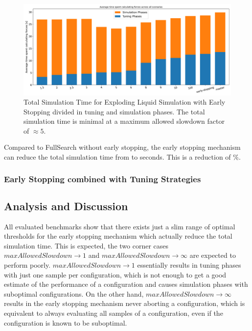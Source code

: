 \documentclass[conference]{IEEEtran}
\begin{document}
\begin{figure}[H]
    \centering

    \includegraphics[width=\columnwidth]{../data/explodingLiquid/analytics/total_time_average.png}

    \caption{Total Simulation Time for Exploding Liquid Simulation with Early Stopping divided in tuning and simulation phases. The total simulation time is minimal at a maximum allowed slowdown factor of $\approx5$.}
\end{figure}

Compared to FullSearch without early stopping, the early stopping mechanism can reduce the total simulation time from  to  seconds. This is a reduction of \%.


\subsubsection{Early Stopping combined with Tuning Strategies}



\subsection{Analysis and Discussion}

All evaluated benchmarks show that there exists just a slim range of optimal thresholds for the early stopping mechanism which actually reduce the total simulation time. This is expected, the two corner cases $maxAllowedSlowdown \to 1$ and $maxAllowedSlowdown \to \infty$ are expected to perform poorly. $maxAllowedSlowdown \to 1$ essentially results in tuning phases with just one sample per configuration, which is not enough to get a good estimate of the performance of a configuration and causes simulation phases with suboptimal configurations. On the other hand, $maxAllowedSlowdown \to \infty$ results in the early stopping mechanism never aborting a configuration, which is equivalent to always evaluating all samples of a configuration, even if the configuration is known to be suboptimal.
\end{document}

